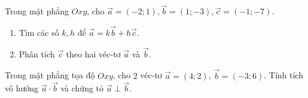 \begin{bt}%
    Trong mặt phẳng $Oxy$, cho $\overrightarrow{a}=\left(-2; 1\right), \overrightarrow{b}=\left(1; -3\right), \overrightarrow{c}=\left(-1; -7\right)$.
    \begin{enumerate}
        \item Tìm các số $k, h$ để $\overrightarrow{a}=k\overrightarrow{b} + h\overrightarrow{c}$. 
        \item Phân tích $\overrightarrow{c}$ theo hai véc-tơ $\overrightarrow{a}$ và $\overrightarrow{b}$.
    \end{enumerate}
\end{bt}

\begin{bt}%
	Trong mặt phẳng tọa độ $Oxy$, cho $2$ véc-tơ $\overrightarrow{a}=(4;2)$, $\overrightarrow{b}=(-3;6)$. Tính tích vô hướng $\overrightarrow{a}\cdot \overrightarrow{b}$ và chứng tỏ $\overrightarrow{a}\perp\overrightarrow{b}$.
\end{bt}

